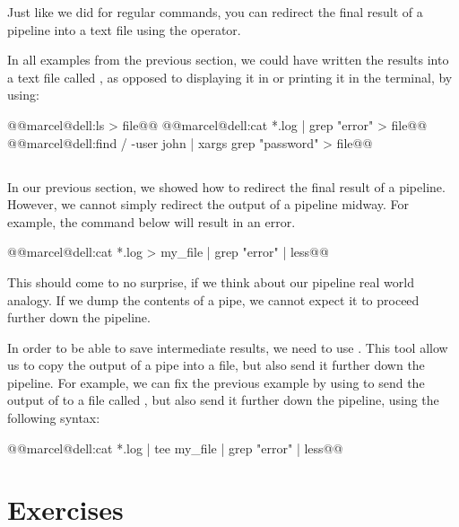 Just like we did for regular commands, you can redirect the final result of a pipeline into a text file using the \mycommand{>} operator.

In all examples from the previous section, we could have written the results into a text file called , as opposed to displaying it in  or printing it in the terminal, by using:

\begin{command_line}[make]
@@marcel@dell:ls > file@@
@@marcel@dell:cat *.log | grep "error" > file@@
@@marcel@dell:find / -user john | xargs grep "password" > file@@
\end{command_line}

\subsection{}

In our previous section, we showed how to redirect the final result of a pipeline. However, we cannot simply redirect the output of a pipeline midway. For example, the command below will result in an error.

\begin{command_line}[make]
@@marcel@dell:cat *.log > my\_file | grep "error" | less@@
\end{command_line}

This should come to no surprise, if we think about our pipeline real world analogy. If we dump the contents of a pipe, we cannot expect it to proceed further down the pipeline.

In order to be able to save intermediate results, we need to use . This tool allow us to copy the output of a pipe into a file, but also send it further down the pipeline. For example, we can fix the previous example by using  to send the output of  to a file called , but also send it further down the pipeline, using the following syntax:

\begin{command_line}[make]
@@marcel@dell:cat *.log | tee my\_file | grep "error" | less@@
\end{command_line}

\newpage
\section*{Exercises}

